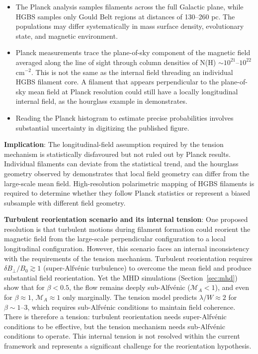 \documentclass[11pt,a4paper]{article}
\begin{document}
\begin{itemize}
    \item The Planck analysis samples filaments across the full Galactic plane, while HGBS samples only Gould Belt regions at distances of 130--260 pc. The populations may differ systematically in mass surface density, evolutionary state, and magnetic environment.
    \item Planck measurements trace the plane-of-sky component of the magnetic field averaged along the line of sight through column densities of N(H) $\sim 10^{21}$--$10^{22}$ cm$^{-2}$. This is not the same as the internal field threading an individual HGBS filament core. A filament that appears perpendicular to the plane-of-sky mean field at Planck resolution could still have a locally longitudinal internal field, as the hourglass example in \citet{Jadhav2026} demonstrates.
    \item Reading the Planck histogram to estimate precise probabilities involves substantial uncertainty in digitizing the published figure.
\end{itemize}

\textbf{Implication}: The longitudinal-field assumption required by the tension mechanism is statistically disfavoured but not ruled out by Planck results. Individual filaments can deviate from the statistical trend, and the hourglass geometry observed by \citet{Jadhav2026} demonstrates that local field geometry can differ from the large-scale mean field. High-resolution polarimetric mapping of HGBS filaments is required to determine whether they follow Planck statistics or represent a biased subsample with different field geometry.

\textbf{Turbulent reorientation scenario and its internal tension}: One proposed resolution is that turbulent motions during filament formation could reorient the magnetic field from the large-scale perpendicular configuration to a local longitudinal configuration. However, this scenario faces an internal inconsistency with the requirements of the tension mechanism. Turbulent reorientation requires $\delta B_{\perp}/B_0 \gtrsim 1$ (super-Alfv\'enic turbulence) to overcome the mean field and produce substantial field reorientation. Yet the MHD simulations (Section~\ref{sec:mhd}) show that for $\beta < 0.5$, the flow remains deeply sub-Alfv\'enic ($\mathcal{M}_A < 1$), and even for $\beta \approx 1$, $\mathcal{M}_A \approx 1$ only marginally. The tension model predicts $\lambda/W \approx 2$ for $\beta \sim 1$--$3$, which requires sub-Alfv\'enic conditions to maintain field coherence. There is therefore a tension: turbulent reorientation needs super-Alfv\'enic conditions to be effective, but the tension mechanism needs sub-Alfv\'enic conditions to operate. This internal tension is not resolved within the current framework and represents a significant challenge for the reorientation hypothesis.
\end{document}

